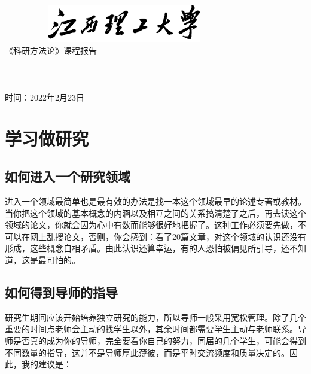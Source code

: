 \documentclass[11pt]{article}
\begin{document}
		\begin{titlepage}
			\centering
			\vspace*{1.75cm}
			\quad\includegraphics[width=10.53cm,height=1.64cm]{1}\\
			\vspace*{5em}
			{\fontsize{19pt}\baselineskip《科研方法论》课程报告}
			\vskip 5cm
			\fontsize{19pt}\baselineskip
			\underline{}\\
			\vskip 0.9cm
			\underline{}\\
			\vskip 0.9cm
			\underline{}\\
			\vskip 0.9cm
			\underline{}\\
			\vskip 2cm
			时间：\LARGE{2022}年2月23日		 
		\end{titlepage}
\newpage

\section{学习做研究}
\subsection{如何进入一个研究领域}

进入一个领域最简单也是最有效的办法是找一本这个领域最早的论述专著或教材。当你把这个领域的基本概念的内涵以及相互之间的关系搞清楚了之后，再去读这个领域的论文，你就会因为心中有数而能够很好地把握了。这种工作必须要先做，不可以在网上乱搜论文，否则，你会感到：看了20篇文章，对这个领域的认识还没有形成，这些概念自相矛盾。由此认识还算幸运，有的人恐怕被偏见所引导，还不知道，这是最可怕的。

\subsection{如何得到导师的指导}

研究生期间应该开始培养独立研究的能力，所以导师一般采用宽松管理。除了几个重要的时间点老师会主动的找学生以外，其余时间都需要学生主动与老师联系。导师是否真的成为你的导师，完全要看你自己的努力，同届的几个学生，可能会得到不同数量的指导，这并不是导师厚此薄彼，而是平时交流频度和质量决定的。因此，我的建议是：
\end{document}
